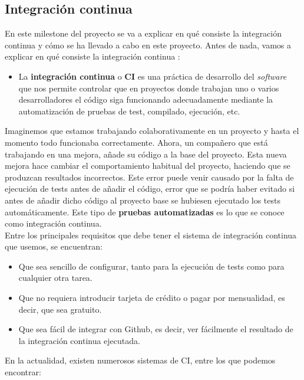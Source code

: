 \subsection{Integración continua}
En este milestone del proyecto se va a explicar en qué consiste la integración continua y
cómo se ha llevado a cabo en este proyecto. Antes de nada, vamos a explicar en qué consiste
la integración continua \cite{continuous-integration}:

    \begin{itemize}
        \item La \textbf{integración continua} o \textbf{CI} es una práctica de desarrollo
        del \textit{software} que nos permite controlar que en proyectos donde trabajan uno
        o varios desarrolladores el código siga funcionando adecuadamente mediante la
        automatización de pruebas de test, compilado, ejecución, etc.
    \end{itemize}

Imaginemos que estamos trabajando colaborativamente en un proyecto y hasta el momento todo
funcionaba correctamente. Ahora, un compañero que está trabajando en una mejora, añade su
código a la base del proyecto. Esta nueva mejora hace cambiar el comportamiento habitual del
proyecto, haciendo que se produzcan resultados incorrectos. Este error puede venir causado
por la falta de ejecución de tests antes de añadir el código, error que se podría haber
evitado si antes de añadir dicho código al proyecto base se hubiesen ejecutado los tests
automáticamente. Este tipo de \textbf{pruebas automatizadas} es lo que se conoce como
integración continua.\\

Entre los principales requisitos que debe tener el sistema de integración continua que
usemos, se encuentran:

    \begin{itemize}
        \item Que sea sencillo de configurar, tanto para la ejecución de tests como para
        cualquier otra tarea.
        \item Que no requiera introducir tarjeta de crédito o pagar por mensualidad, es
        decir, que sea gratuito.
        \item Que sea fácil de integrar con Github, es decir, ver fácilmente el resultado
        de la integración continua ejecutada.
    \end{itemize}

En la actualidad, existen numerosos sistemas de CI, entre los que podemos encontrar:

